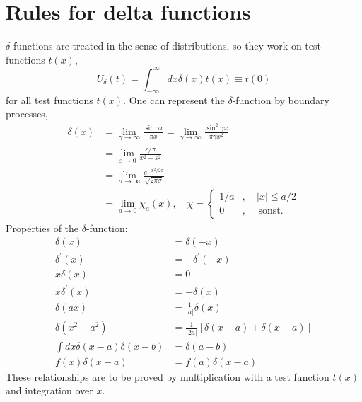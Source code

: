 \section{Rules for delta functions}
$\delta$-functions are treated in the sense of distributions, so they work on test functions $t(x)$,
\begin{equation}
    U_{\delta}(t)=\int_{-\infty}^{\infty} d x \delta(x) t(x) \equiv t(0)
    \end{equation}
for all test functions $t(x)$. One can represent the $\delta$-function by boundary processes,
\begin{equation}
\begin{aligned} \delta(x) &=\lim _{\gamma \rightarrow \infty} \frac{\sin \gamma x}{\pi x}=\lim _{\gamma \rightarrow \infty} \frac{\sin ^{2} \gamma x}{\pi \gamma x^{2}} \\ &=\lim _{\varepsilon \rightarrow 0} \frac{\varepsilon / \pi}{x^{2}+\varepsilon^{2}} \\ &=\lim _{\sigma \rightarrow \infty} \frac{e^{-x^{2} / 2 \sigma}}{\sqrt{2 \pi \sigma}} \\ &=\lim _{a \rightarrow 0} \chi_{a}(x), \quad \chi=\left\{\begin{array}{cc}{1 / a} & {, \quad|x| \leq a / 2} \\ {0} & {, \quad \text { sonst. }}\end{array}\right.\end{aligned}
\end{equation}
Properties of the $\delta$-function:
\begin{equation}
\begin{aligned} \delta(x) &=\delta(-x) \\ \delta^{\prime}(x) &=-\delta^{\prime}(-x) \\ x \delta(x) &=0 \\ x \delta^{\prime}(x) &=-\delta(x) \\ \delta(a x) &=\frac{1}{|a|} \delta(x) \\ \delta\left(x^{2}-a^{2}\right) &=\frac{1}{|2 a|}[\delta(x-a)+\delta(x+a)] \\ \int d x \delta(x-a) \delta(x-b) &=\delta(a-b) \\ f(x) \delta(x-a) &=f(a) \delta(x-a) \end{aligned}
\end{equation}
These relationships are to be proved by multiplication with a test function $t (x)$ and integration over $x$.\\\\
